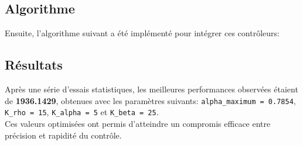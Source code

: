 \documentclass[../CSC_5RO16_TA_TP3.tex]{subfiles}
\begin{document}
\subsection{Algorithme}
\noindent Ensuite, l'algorithme suivant a été implémenté pour intégrer ces contrôleurs:
\begin{scriptsize}\mycode
    
\end{scriptsize}

\subsection{Résultats}
\noindent Après une série d'essais statistiques, les meilleures performances observées étaient de \textbf{1936.1429}, obtenues avec les paramètres suivants: \texttt{alpha\_maximum = 0.7854}, \texttt{K\_rho = 15}, \texttt{K\_alpha = 5} et \texttt{K\_beta = 25}.\\

\noindent Ces valeurs optimisées ont permis d’atteindre un compromis efficace entre précision et rapidité du contrôle.
\end{document}

